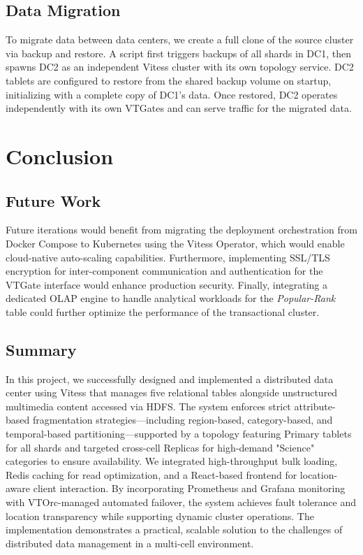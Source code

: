 \documentclass{article}
\begin{document}
\subsection{Data Migration}

To migrate data between data centers, we create a full clone of the source cluster via backup and restore. A script first triggers backups of all shards in DC1, then spawns DC2 as an independent Vitess cluster with its own topology service. DC2 tablets are configured to restore from the shared backup volume on startup, initializing with a complete copy of DC1's data. Once restored, DC2 operates independently with its own VTGates and can serve traffic for the migrated data.


\section{Conclusion}

\subsection{Future Work}
Future iterations would benefit from migrating the deployment orchestration from Docker Compose to Kubernetes using the Vitess Operator, which would enable cloud-native auto-scaling capabilities. Furthermore, implementing SSL/TLS encryption for inter-component communication and authentication for the VTGate interface would enhance production security. Finally, integrating a dedicated OLAP engine to handle analytical workloads for the \textit{Popular-Rank} table could further optimize the performance of the transactional cluster.

\subsection{Summary}
In this project, we successfully designed and implemented a distributed data center using Vitess that manages five relational tables alongside unstructured multimedia content accessed via HDFS. The system enforces strict attribute-based fragmentation strategies—including region-based, category-based, and temporal-based partitioning—supported by a topology featuring Primary tablets for all shards and targeted cross-cell Replicas for high-demand "Science" categories to ensure availability. We integrated high-throughput bulk loading, Redis caching for read optimization, and a React-based frontend for location-aware client interaction. By incorporating Prometheus and Grafana monitoring with VTOrc-managed automated failover, the system achieves fault tolerance and location transparency while supporting dynamic cluster operations. The implementation demonstrates a practical, scalable solution to the challenges of distributed data management in a multi-cell environment.
\end{document}
